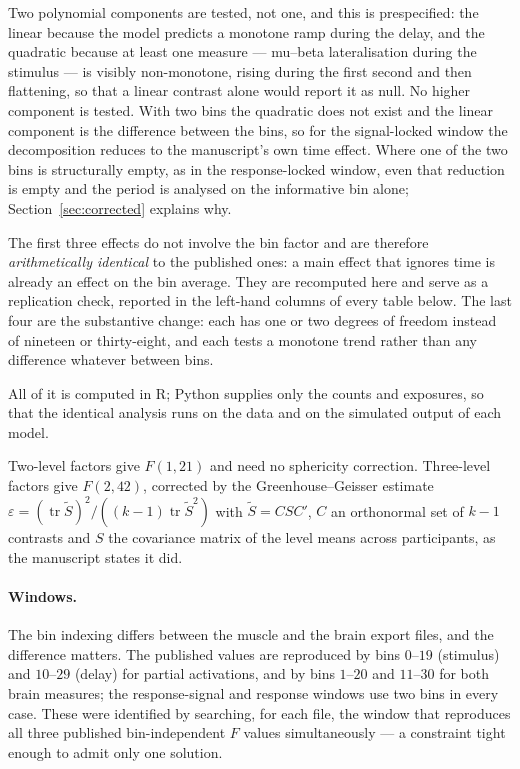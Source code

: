 \documentclass[a4paper,11pt]{article}
\newcommand{\NN}[1]{\textcolor{newcol}{#1}}
\newcommand{\1}{\mathbbm{1}}
\begin{document}
\NN{Two polynomial components are tested, not one, and this is prespecified}: the linear
because the model predicts a monotone ramp during the delay, and the quadratic because
at least one measure --- mu--beta lateralisation during the stimulus --- is visibly
non-monotone, rising during the first second and then flattening, so that a linear
contrast alone would report it as null. No higher component is tested. With two bins the
quadratic does not exist and the linear component is the difference between the bins, so
for the signal-locked window the decomposition reduces to the manuscript's own time
effect. \NN{Where one of the two bins is structurally empty, as in the response-locked window,
even that reduction is empty and the period is analysed on the informative bin alone;
Section~\ref{sec:corrected} explains why.}

The first three effects do not involve the bin factor and are therefore
\emph{arithmetically identical} to the published ones: a main effect that ignores time is already an effect
on the bin average. They are recomputed here and serve as a replication check, reported
in the left-hand columns of every table below. The last four are the substantive
change: each has one or two degrees of freedom instead of nineteen or thirty-eight, and
each tests a monotone trend rather than any difference whatever between bins.

All of it is computed in R; Python supplies only the counts and exposures, so that
the identical analysis runs on the data and on the simulated output of each model.

Two-level factors give $F(1,21)$ and need no sphericity correction. Three-level factors
give $F(2,42)$, corrected by the Greenhouse--Geisser estimate
$\varepsilon=(\operatorname{tr}\tilde S)^2/((k-1)\operatorname{tr}\tilde S^2)$ with
$\tilde S=CSC'$, $C$ an orthonormal set of $k-1$ contrasts and $S$ the covariance matrix
of the level means across participants, as the manuscript states it did.

\paragraph{Windows.} \NN{The bin indexing differs between the muscle and the brain export
files, and the difference matters.} The published values are reproduced by bins
$0$--$19$ (stimulus) and $10$--$29$ (delay) for partial activations, and by bins
$1$--$20$ and $11$--$30$ for both brain measures; the response-signal and response
windows use two bins in every case. These were identified by searching, for each file,
the window that reproduces all three published bin-independent $F$ values
simultaneously --- a constraint tight enough to admit only one solution.
\end{document}
